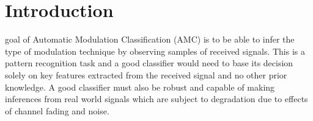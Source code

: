 \documentclass[12pt,journal,onecolumn,twoside]{IEEEtran}
\begin{document}








\maketitle



%
\IEEEpeerreviewmaketitle


\section{Introduction}
% 
% 
% 
% 
 goal of Automatic Modulation Classification (AMC) is to be able to infer the type of modulation technique by observing samples of received signals. This is a pattern recognition task and a good classifier would need to base its decision solely on key features extracted from the received signal and no other prior knowledge. A good classifier must also be robust and capable of making inferences from real world signals which are subject to degradation due to effects of channel fading and noise.
\end{document}
